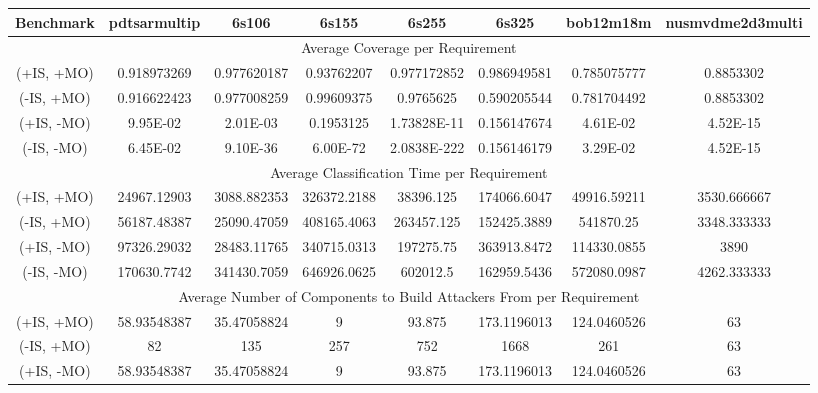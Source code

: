 \newpage
\begin{landscape}
	\begin{table}[!t]
		\centering		
		\centering
		\begin{tabular}{|c|c|c|c|c|c|c|c|}
			\hline
			Benchmark  & pdtsarmultip & 6s106       & 6s155       & 6s255       & 6s325       & bob12m18m   & nusmvdme2d3multi \\ \hline
			\multicolumn{8}{|c|}{Average Coverage per Requirement}                                                             \\ \hline
			(+IS, +MO) & 0.918973269  & 0.977620187 & 0.93762207  & 0.977172852 & 0.986949581 & 0.785075777 & 0.8853302        \\
			(-IS, +MO) & 0.916622423  & 0.977008259 & 0.99609375  & 0.9765625   & 0.590205544 & 0.781704492 & 0.8853302        \\
			(+IS, -MO) & 9.95E-02     & 2.01E-03    & 0.1953125   & 1.73828E-11 & 0.156147674 & 4.61E-02    & 4.52E-15         \\
			(-IS, -MO) & 6.45E-02     & 9.10E-36    & 6.00E-72    & 2.0838E-222 & 0.156146179 & 3.29E-02    & 4.52E-15         \\ \hline
			\multicolumn{8}{|c|}{Average Classification Time per Requirement}                                                  \\ \hline
			(+IS, +MO) & 24967.12903  & 3088.882353 & 326372.2188 & 38396.125   & 174066.6047 & 49916.59211 & 3530.666667      \\
			(-IS, +MO) & 56187.48387  & 25090.47059 & 408165.4063 & 263457.125  & 152425.3889 & 541870.25   & 3348.333333      \\
			(+IS, -MO) & 97326.29032  & 28483.11765 & 340715.0313 & 197275.75   & 363913.8472 & 114330.0855 & 3890             \\
			(-IS, -MO) & 170630.7742  & 341430.7059 & 646926.0625 & 602012.5    & 162959.5436 & 572080.0987 & 4262.333333      \\ \hline
			\multicolumn{8}{|c|}{Average Number of Components to Build Attackers From per Requirement}                         \\ 
			\hline
			(+IS, +MO) & 58.93548387  & 35.47058824 & 9           & 93.875      & 173.1196013 & 124.0460526 & 63               \\
			(-IS, +MO) & 82           & 135         & 257         & 752         & 1668        & 261         & 63               \\
			(+IS, -MO) & 58.93548387  & 35.47058824 & 9           & 93.875      & 173.1196013 & 124.0460526 & 63               \\

\end{tabular}
\end{table}
\end{landscape}
